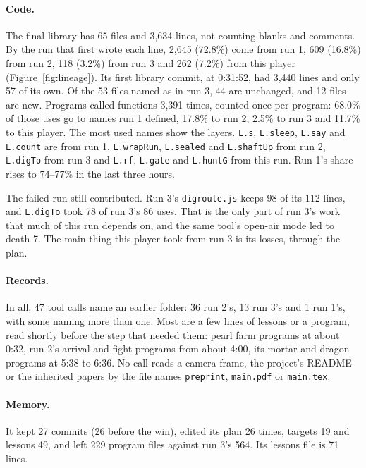 \documentclass[11pt,a4paper]{article}
\begin{document}
\paragraph{Code.} The final library has 65 files and 3,634 lines, not counting blanks and comments. By the run that first wrote each line, 2,645 (72.8\%) come from run 1, 609 (16.8\%) from run 2, 118 (3.2\%) from run 3 and 262 (7.2\%) from this player (Figure~\ref{fig:lineage}). Its first library commit, at 0:31:52, had 3,440 lines and only 57 of its own. Of the 53 files named as in run 3, 44 are unchanged, and 12 files are new. Programs called functions 3,391 times, counted once per program: 68.0\% of those uses go to names run 1 defined, 17.8\% to run 2, 2.5\% to run 3 and 11.7\% to this player. The most used names show the layers. \texttt{L.s}, \texttt{L.sleep}, \texttt{L.say} and \texttt{L.count} are from run 1, \texttt{L.wrapRun}, \texttt{L.sealed} and \texttt{L.shaftUp} from run 2, \texttt{L.digTo} from run 3 and \texttt{L.rf}, \texttt{L.gate} and \texttt{L.huntG} from this run. Run 1's share rises to 74--77\% in the last three hours.

The failed run still contributed. Run 3's \texttt{digroute.js} keeps 98 of its 112 lines, and \texttt{L.digTo} took 78 of run 3's 86 uses. That is the only part of run 3's work that much of this run depends on, and the same tool's open-air mode led to death 7. The main thing this player took from run 3 is its losses, through the plan.

\paragraph{Records.} In all, 47 tool calls name an earlier folder: 36 run 2's, 13 run 3's and 1 run 1's, with some naming more than one. Most are a few lines of lessons or a program, read shortly before the step that needed them: pearl farm programs at about 0:32, run 2's arrival and fight programs from about 4:00, its mortar and dragon programs at 5:38 to 6:36. No call reads a camera frame, the project's README or the inherited papers by the file names \texttt{preprint}, \texttt{main.pdf} or \texttt{main.tex}.

\paragraph{Memory.} It kept 27 commits (26 before the win), edited its plan 26 times, targets 19 and lessons 49, and left 229 program files against run 3's 564. Its lessons file is 71 lines.
\end{document}
